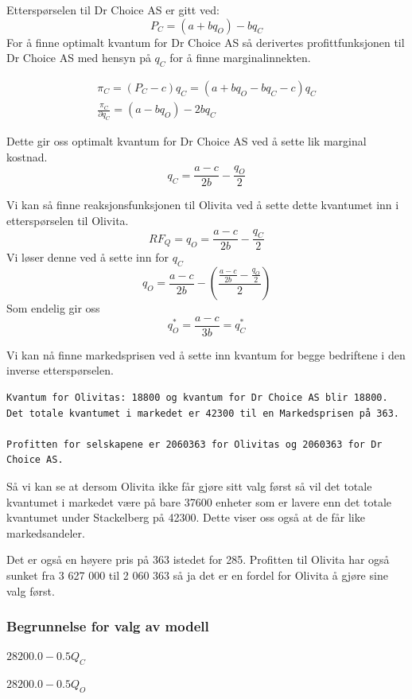 \documentclass[
  12pt,
  a4paper,
  DIV=11,
  numbers=noendperiod]{scrartcl}
\begin{document}
Etterspørselen til Dr Choice AS er gitt ved: \[
P_C = (a  + bq_O)-bq_C
\] For å finne optimalt kvantum for Dr Choice AS så derivertes
profittfunksjonen til Dr Choice AS med hensyn på \(q_C\) for å finne
marginalinnekten.

\begin{align*}
\pi_C = (P_C - c)q_C = (a  + bq_O - bq_C - c)q_C \\
\frac{\pi_C}{\partial q_C} = (a - bq_O) - 2bq_C
\end{align*}

Dette gir oss optimalt kvantum for Dr Choice AS ved å sette lik marginal
kostnad. \[
q_C = \frac{a - c}{2b} - \frac{q_O}{2}
\]

Vi kan så finne reaksjonsfunksjonen til Olivita ved å sette dette
kvantumet inn i etterspørselen til Olivita. \[
RF_Q = q_O = \frac{a - c}{2b} - \frac{q_C}{2}
\] Vi løser denne ved å sette inn for \(q_C\) \[
q_O = \frac{a - c}{2b} - \left(\frac{\frac{a - c}{2b} - \frac{q_O}{2}}{2}\right)
\] Som endelig gir oss \[
q_O^* = \frac{a - c}{3b} = q_C^*
\]

Vi kan nå finne markedsprisen ved å sette inn kvantum for begge
bedriftene i den inverse etterspørselen.

\begin{verbatim}
Kvantum for Olivitas: 18800 og kvantum for Dr Choice AS blir 18800. 
Det totale kvantumet i markedet er 42300 til en Markedsprisen på 363.

Profitten for selskapene er 2060363 for Olivitas og 2060363 for Dr Choice AS.
\end{verbatim}

Så vi kan se at dersom Olivita ikke får gjøre sitt valg først så vil det
totale kvantumet i markedet være på bare 37600 enheter som er lavere enn
det totale kvantumet under Stackelberg på 42300. Dette viser oss også at
de får like markedsandeler.

Det er også en høyere pris på 363 istedet for 285. Profitten til Olivita
har også sunket fra 3 627 000 til 2 060 363 så ja det er en fordel for
Olivita å gjøre sine valg først.

\subsubsection{Begrunnelse for valg av
modell}\label{begrunnelse-for-valg-av-modell}

$\displaystyle 28200.0 - 0.5 Q_{C}$

$\displaystyle 28200.0 - 0.5 Q_{O}$
\end{document}
